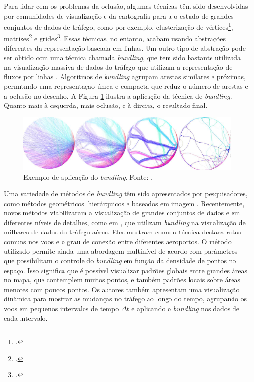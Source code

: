   Para lidar com os problemas da oclusão, algumas técnicas têm sido
desenvolvidas por comunidades de visualização e da cartografia para a o estudo
de grandes conjuntos de dados de tráfego, como por exemplo, clusterização de
vértices\footcite{Schaeffer2007,Andrienko2011}, matrizes\footcite{Elmqvist2008}
e grides\footcite{JoWood2010}. Essas técnicas, no entanto, acabam usando
abstrações diferentes da representação baseada em linhas. Um outro tipo de
abstração pode ser obtido com uma técnica chamada \emph{bundling}, que tem sido
bastante utilizada na visualização massiva de dados do tráfego que utilizam a
representação de fluxos por linhas \citep{Zhou2013}. Algoritmos de
\emph{bundling} agrupam arestas similares e próximas, permitindo uma
representação única e compacta que reduz o número de arestas e a oclusão no
desenho. A Figura \ref{fig:exemplo-bund} ilustra a aplicação da técnica de
\emph{bundling}.  Quanto mais à esquerda, mais oclusão, e à direita, o
resultado final.

\begin{figure}[!htb]
  \centering
  \includegraphics[width=1\textwidth]{../figuras/bundle-ex.png}
\caption[Exemplo de aplicação do \emph{bundling}]{Exemplo de aplicação do \emph{bundling}. Fonte: \citet{Hurter2012}.}
  \label{fig:exemplo-bund}
\end{figure}

  Uma variedade de métodos de \emph{bundling} têm sido apresentados por
pesquisadores, como métodos geométricos, hierárquicos e baseados em imagem
\citep{Lhuillier2017}. Recentemente, novos métodos viabilizaram a visualização
de grandes conjuntos de dados e em diferentes níveis de detalhes, como em
\citet{Klein2014}, que utilizam \emph{bundling} na visualização de milhares de
dados do tráfego aéreo. Eles mostram como a técnica destaca rotas comuns nos
voos e o grau de conexão entre diferentes aeroportos. O método utilizado
permite ainda uma abordagem multinível de acordo com parâmetros que
possibilitam o controle do \emph{bundling} em função da densidade de pontos no
espaço. Isso significa que é possível visualizar padrões globais entre grandes
áreas no mapa, que contemplem muitos pontos, e também padrões locais sobre
áreas menores com poucos pontos. Os autores também apresentam uma visualização
dinâmica para mostrar as mudanças no tráfego ao longo do tempo, agrupando os
voos em pequenos intervalos de tempo $\Delta t$ e aplicando o \emph{bundling}
nos dados de cada intervalo.

